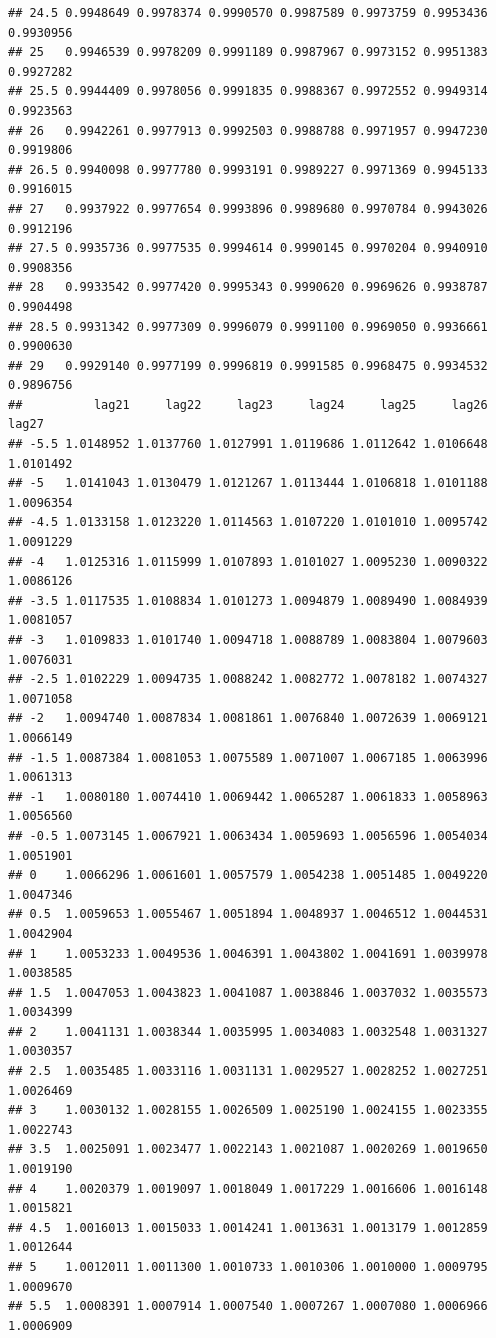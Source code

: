 \documentclass[
]{book}
\begin{document}
\begin{verbatim}
## 24.5 0.9948649 0.9978374 0.9990570 0.9987589 0.9973759 0.9953436 0.9930956
## 25   0.9946539 0.9978209 0.9991189 0.9987967 0.9973152 0.9951383 0.9927282
## 25.5 0.9944409 0.9978056 0.9991835 0.9988367 0.9972552 0.9949314 0.9923563
## 26   0.9942261 0.9977913 0.9992503 0.9988788 0.9971957 0.9947230 0.9919806
## 26.5 0.9940098 0.9977780 0.9993191 0.9989227 0.9971369 0.9945133 0.9916015
## 27   0.9937922 0.9977654 0.9993896 0.9989680 0.9970784 0.9943026 0.9912196
## 27.5 0.9935736 0.9977535 0.9994614 0.9990145 0.9970204 0.9940910 0.9908356
## 28   0.9933542 0.9977420 0.9995343 0.9990620 0.9969626 0.9938787 0.9904498
## 28.5 0.9931342 0.9977309 0.9996079 0.9991100 0.9969050 0.9936661 0.9900630
## 29   0.9929140 0.9977199 0.9996819 0.9991585 0.9968475 0.9934532 0.9896756
##          lag21     lag22     lag23     lag24     lag25     lag26     lag27
## -5.5 1.0148952 1.0137760 1.0127991 1.0119686 1.0112642 1.0106648 1.0101492
## -5   1.0141043 1.0130479 1.0121267 1.0113444 1.0106818 1.0101188 1.0096354
## -4.5 1.0133158 1.0123220 1.0114563 1.0107220 1.0101010 1.0095742 1.0091229
## -4   1.0125316 1.0115999 1.0107893 1.0101027 1.0095230 1.0090322 1.0086126
## -3.5 1.0117535 1.0108834 1.0101273 1.0094879 1.0089490 1.0084939 1.0081057
## -3   1.0109833 1.0101740 1.0094718 1.0088789 1.0083804 1.0079603 1.0076031
## -2.5 1.0102229 1.0094735 1.0088242 1.0082772 1.0078182 1.0074327 1.0071058
## -2   1.0094740 1.0087834 1.0081861 1.0076840 1.0072639 1.0069121 1.0066149
## -1.5 1.0087384 1.0081053 1.0075589 1.0071007 1.0067185 1.0063996 1.0061313
## -1   1.0080180 1.0074410 1.0069442 1.0065287 1.0061833 1.0058963 1.0056560
## -0.5 1.0073145 1.0067921 1.0063434 1.0059693 1.0056596 1.0054034 1.0051901
## 0    1.0066296 1.0061601 1.0057579 1.0054238 1.0051485 1.0049220 1.0047346
## 0.5  1.0059653 1.0055467 1.0051894 1.0048937 1.0046512 1.0044531 1.0042904
## 1    1.0053233 1.0049536 1.0046391 1.0043802 1.0041691 1.0039978 1.0038585
## 1.5  1.0047053 1.0043823 1.0041087 1.0038846 1.0037032 1.0035573 1.0034399
## 2    1.0041131 1.0038344 1.0035995 1.0034083 1.0032548 1.0031327 1.0030357
## 2.5  1.0035485 1.0033116 1.0031131 1.0029527 1.0028252 1.0027251 1.0026469
## 3    1.0030132 1.0028155 1.0026509 1.0025190 1.0024155 1.0023355 1.0022743
## 3.5  1.0025091 1.0023477 1.0022143 1.0021087 1.0020269 1.0019650 1.0019190
## 4    1.0020379 1.0019097 1.0018049 1.0017229 1.0016606 1.0016148 1.0015821
## 4.5  1.0016013 1.0015033 1.0014241 1.0013631 1.0013179 1.0012859 1.0012644
## 5    1.0012011 1.0011300 1.0010733 1.0010306 1.0010000 1.0009795 1.0009670
## 5.5  1.0008391 1.0007914 1.0007540 1.0007267 1.0007080 1.0006966 1.0006909

\end{verbatim}
\end{document}
